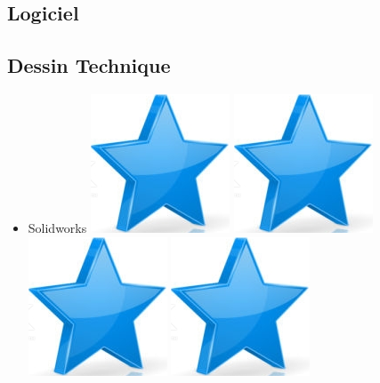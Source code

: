 \documentclass[10pt,a4paper,sans]{article}
\begin{document}
\begin{minipage}[t]{0.28\textwidth}
    \begin{mdframed}[style=cadreCompetences]
        \section{Logiciel}
        \subsection{Dessin Technique}
        \begin{itemize}
            \item{Solidworks
                    \hfill
                    \includegraphics[scale=0.25]{img/star.png} \hspace{-0.22cm}
                    \includegraphics[scale=0.25]{img/star.png} \hspace{-0.22cm}
                    \includegraphics[scale=0.25]{img/star.png} \hspace{-0.22cm}
                    \includegraphics[scale=0.25]{img/star.png} \hspace{-0.22cm}
}
\end{itemize}
\end{mdframed}
\end{minipage}
\end{document}
